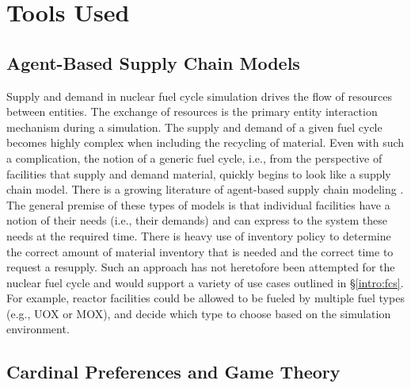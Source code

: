 
\section{Tools Used}

\subsection{Agent-Based Supply Chain Models}\label{intro:sim}

Supply and demand in nuclear fuel cycle simulation drives the flow of resources
between entities. The exchange of resources is the primary entity interaction
mechanism during a simulation. The supply and demand of a given fuel cycle
becomes highly complex when including the recycling of material. Even with such
a complication, the notion of a generic fuel cycle, i.e., from the perspective
of facilities that supply and demand material, quickly begins to look like a
supply chain model. There is a growing literature of agent-based supply chain
modeling
\cite{swaminathan_modeling_1998,julka_agent-based_2002,van_der_zee_modeling_2005,chatfield_multi-formalism_2007,holmgren_agent_2007}.
The general premise of these types of models is that individual facilities have
a notion of their needs (i.e., their demands) and can express to the system
these needs at the required time. There is heavy use of inventory policy to
determine the correct amount of material inventory that is needed and the
correct time to request a resupply. Such an approach has not heretofore been
attempted for the nuclear fuel cycle and would support a variety of use cases
outlined in \S \ref{intro:fcs}. For example, reactor facilities could be allowed
to be fueled by multiple fuel types (e.g., UOX or MOX), and decide which type to
choose based on the simulation environment.

\subsection{Cardinal Preferences and Game Theory}

